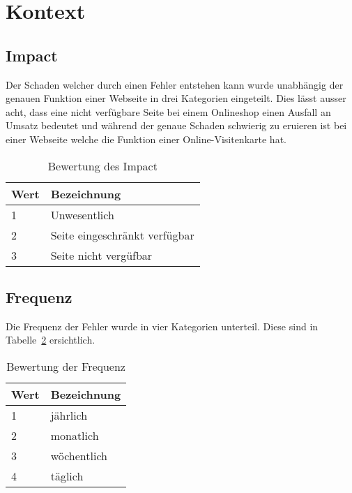 
\section{Kontext}
\label{sec:kontext}

\makeatletter
{} \setcounter{fnumber}{0}
\renewcommand\thefnumber{F\arabic{fnumber}}
\newcommand{\newfnumber}[5]%
{%
\midrule%
\refstepcounter{fnumber}%
\expandafter\xdef\csname f#2\endcsname {#1}%
\thefnumber\label{f:#2} & #1 & #3 & #4 & #5 \\
}
\makeatother

\subsection{Impact}
\label{sub:impact}
Der Schaden welcher durch einen Fehler entstehen kann wurde unabhängig der genauen Funktion einer Webseite in drei Kategorien eingeteilt. Dies lässt ausser acht, dass eine nicht verfügbare Seite bei einem Onlineshop einen Ausfall an Umsatz bedeutet und während der genaue Schaden schwierig zu eruieren ist bei einer Webseite welche die Funktion einer Online-Visitenkarte hat.


\begin{table}[h!]
  \centering
  \begin{tabular}{ll}
  \toprule
    Wert & Bezeichnung\\
  \hline
    1 & Unwesentlich\\
  \hline
    2 & Seite eingeschränkt verfügbar\\
  \hline
    3 & Seite nicht vergüfbar\\
  \bottomrule
  \end{tabular}
  \caption{Bewertung des Impact}
  \label{tab:impact}
\end{table}

\subsection{Frequenz}
\label{sub:frequenz}
Die Frequenz der Fehler wurde in vier Kategorien unterteil. Diese sind in Tabelle~\ref{tab:fehler_frequenz} ersichtlich.

\begin{table}[h!]
  \centering
  \begin{tabular}{ll}
  \toprule
    Wert & Bezeichnung\\
  \hline
    1 & jährlich\\
  \hline
    2 & monatlich\\
  \hline
    3 & wöchentlich\\
  \hline
    4 & täglich\\
  \bottomrule
  \end{tabular}
  \caption{Bewertung der Frequenz}
  \label{tab:fehler_frequenz}
\end{table}

